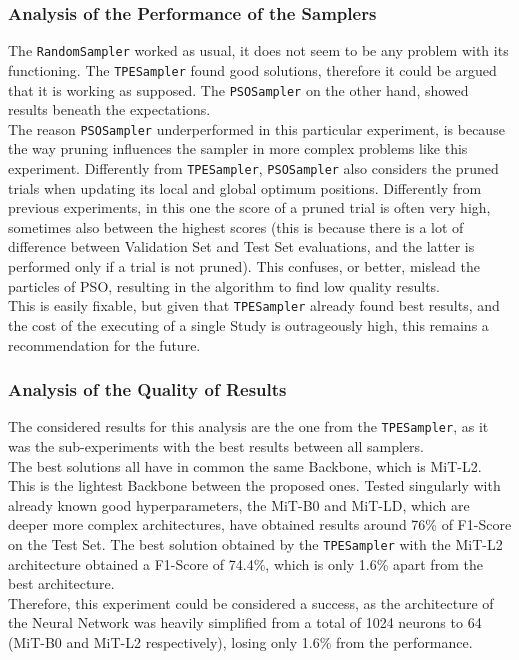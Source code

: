 \subsubsection{Analysis of the Performance of the Samplers}

The \texttt{RandomSampler} worked as usual, it does not seem to be any problem with its functioning. The \texttt{TPESampler} found good solutions, therefore it could be argued that it is working as supposed. The \texttt{PSOSampler} on the other hand, showed results beneath the expectations.
\\[0.3cm]The reason \texttt{PSOSampler} underperformed in this particular experiment, is because the way pruning influences the sampler in more complex problems like this experiment.
Differently from \texttt{TPESampler}, \texttt{PSOSampler} also considers the pruned trials when updating its local and global optimum positions. Differently from previous experiments, in this one the score of a pruned trial is often very high, sometimes also between the highest scores (this is because there is a lot of difference between Validation Set and Test Set evaluations, and the latter is performed only if a trial is not pruned). This confuses, or better, mislead the particles of PSO, resulting in the algorithm to find low quality results.
\\[0.3cm]This is easily fixable, but given that \texttt{TPESampler} already found best results, and the cost of the executing of a single Study is outrageously high, this remains a recommendation for the future.

\subsubsection{Analysis of the Quality of Results}

The considered results for this analysis are the one from the \texttt{TPESampler}, as it was the sub-experiments with the best results between all samplers.
\\[0.3cm]The best solutions all have in common the same Backbone, which is MiT-L2. This is the lightest Backbone between the proposed ones.
Tested singularly with already known good hyperparameters, the MiT-B0 and MiT-LD, which are deeper more complex architectures, have obtained results around 76\% of F1-Score on the Test Set.
The best solution obtained by the \texttt{TPESampler} with the MiT-L2 architecture obtained a F1-Score of 74.4\%, which is only 1.6\% apart from the best architecture.
\\[0.3cm]Therefore, this experiment could be considered a success, as the architecture of the Neural Network was heavily simplified from a total of 1024 neurons to 64 (MiT-B0 and MiT-L2 respectively), losing only 1.6\% from the performance.




